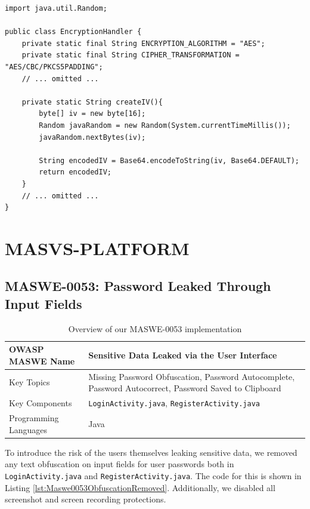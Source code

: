 \begin{lstlisting}[style=JavaStyle, float=tbh, captionpos=b, caption={Using \texttt{java.util.Random} API and current system time for generating random values}, label={lst:Maswe0027GeneratingRandomValues}]
import java.util.Random;

public class EncryptionHandler {
    private static final String ENCRYPTION_ALGORITHM = "AES";
    private static final String CIPHER_TRANSFORMATION = "AES/CBC/PKCS5PADDING";
    // ... omitted ...
    
    private static String createIV(){
        byte[] iv = new byte[16];
        Random javaRandom = new Random(System.currentTimeMillis());
        javaRandom.nextBytes(iv);
    
        String encodedIV = Base64.encodeToString(iv, Base64.DEFAULT);
        return encodedIV;
    }
    // ... omitted ...
}
\end{lstlisting}



\section{MASVS-PLATFORM}

\subsection{MASWE-0053: Password Leaked Through Input Fields}
\label{subsec:maswe-0053}

\begin{table}[H]
\centering
\renewcommand{\arraystretch}{1.3}
\begin{tabular}{p{5cm} p{8cm}} 
\toprule
OWASP MASWE Name & Sensitive Data Leaked via the User Interface \\ 
\midrule
Key Topics & Missing Password Obfuscation, Password Autocomplete, Password Autocorrect, Password Saved to Clipboard \\
Key Components & \texttt{LoginActivity.java}, \texttt{RegisterActivity.java} \\
Programming Languages & Java \\ 
\bottomrule
\end{tabular}
\caption{Overview of our MASWE-0053 implementation}
\label{tab:maswe-0053}
\end{table}

To introduce the risk of the users themselves leaking sensitive data, we removed any text obfuscation on input fields for user passwords both in \texttt{LoginActivity.java} and \texttt{RegisterActivity.java}. The code for this is shown in Listing \ref{lst:Maswe0053ObfuscationRemoved}. Additionally, we disabled all screenshot and screen recording protections. 

